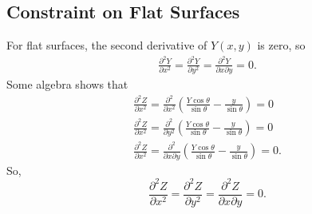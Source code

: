 \documentclass[a4paper]{article}
\begin{document}
\subsection{Constraint on Flat Surfaces}
For flat surfaces, the second derivative of $Y(x, y)$ is zero, so
\begin{align*}
    \frac{\partial^2 Y}{\partial x^2} = \frac{\partial^2 Y}{\partial y^2} = \frac{\partial^2 Y}{\partial x \partial y} = 0.
\end{align*}
Some algebra shows that
\begin{align*}
    \frac{\partial^2 Z}{\partial x^2} = \frac{\partial^2}{\partial x^2} \left( \frac{Y \cos \theta}{\sin \theta} - \frac{y}{\sin \theta} \right) = 0 \\
    \frac{\partial^2 Z}{\partial x^2} = \frac{\partial^2}{\partial y^2} \left( \frac{Y \cos \theta}{\sin \theta} - \frac{y}{\sin \theta} \right) = 0 \\
    \frac{\partial^2 Z}{\partial x^2} = \frac{\partial^2}{\partial x \partial y} \left( \frac{Y \cos \theta}{\sin \theta} - \frac{y}{\sin \theta} \right) = 0.
\end{align*}
So, 
$$\frac{\partial^2 Z}{\partial x^2} = \frac{\partial^2 Z}{\partial y^2} = \frac{\partial^2 Z}{\partial x \partial y} = 0.$$
\end{document}
